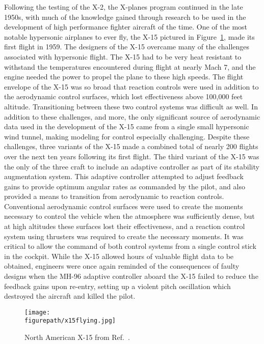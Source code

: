 Following the testing of the X-2, the X-planes program continued in the late 1950s, with much of the knowledge gained through research to be used in the development of high performance fighter aircraft of the time.
One of the most notable hypersonic airplanes to ever fly, the X-15 pictured in Figure~\ref{fig:x15flying}, made its first flight in 1959.
The designers of the X-15 overcame many of the challenges associated with hypersonic flight.
The X-15 had to be very heat resistant to withstand the temperatures encountered during flight at nearly Mach 7, and the engine needed the power to propel the plane to these high speeds.
The flight envelope of the X-15 was so broad that reaction controls were used in addition to the aerodynamic control surfaces, which lost effectiveness above 100,000 feet altitude.
Transitioning between these two control systems was difficult as well.
In addition to these challenges, and more, the only significant source of aerodynamic data used in the development of the X-15 came from a single small hypersonic wind tunnel, making modeling for control especially challenging.
Despite these challenges, three variants of the X-15 made a combined total of nearly 200 flights over the next ten years following its first flight.
The third variant of the X-15 was the only of the three craft to include an adaptive controller as part of its stability augmentation system.
This adaptive controller attempted to adjust feedback gains to provide optimum angular rates as commanded by the pilot, and also provided a means to transition from aerodynamic to reaction controls.
Conventional aerodynamic control surfaces were used to create the moments necessary to control the vehicle when the atmosphere was sufficiently dense, but at high altitudes these surfaces lost their effectiveness, and a reaction control system using thrusters was required to create the necessary moments.
It was critical to allow the command of both control systems from a single control stick in the cockpit.
While the X-15 allowed hours of valuable flight data to be obtained, engineers were once again reminded of the consequences of faulty designs when the MH-96 adaptive controller aboard the X-15 failed to reduce the feedback gains upon re-entry, setting up a violent pitch oscillation which destroyed the aircraft and killed the pilot.

 \begin{figure}[h]
  \begin{center}
    \texttt{[image: \\figurepath/x15flying.jpg]}
    \caption{North American X-15 from Ref.\ \cite{x15picture}.\label{fig:x15flying}}
  \end{center}
\end{figure}

